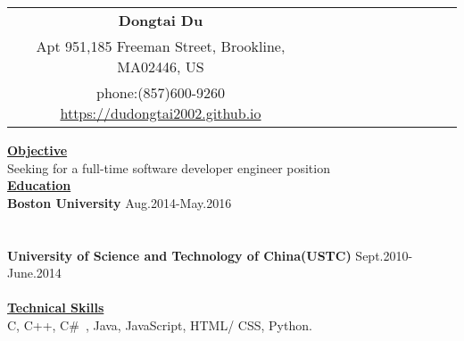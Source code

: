 \documentclass{resume} %
\begin{document}
 \small
\begin{spacing}{1}
\vspace{-0.5in}

\begin{center}
\begin{tabular}{*{11}{c}}
    \vspace{-0.5pt}
    \textbf{\Huge{Dongtai Du}}\\
    {\footnotesize Apt 951,185 Freeman Street, Brookline, MA02446, US} \\
    {\footnotesize phone:(857)600-9260} \hspace{1cm} {\footnotesize \url{https://dudongtai2002.github.io}}\hspace{1cm}{\footnotesize \url{Email:dudongtai2002@gmail.com}} \\
\end{tabular}

\uline{{\bf{\LARGE Objective}}\hfill{\hspace{15cm}{}}} \\
\vspace{1mm}
\hspace{-10.5cm} {Seeking for a full-time software developer engineer position}
\vspace{4mm}\\
\uline{{\bf{\LARGE Education}}\hfill{\hspace{15cm}{}}} \\
\vspace{1mm}
{\bf Boston University \hspace{3cm} } \hfill {\hspace{2cm}Aug.2014-May.2016} \\
\hspace{3cm}
\\
\hspace{3.0cm}{Advanced Data Structure, Cloud Computing, Machine Learning}\\
{\bf University of Science and Technology of China(USTC) \hspace{1.8cm} } \hfill {Sept.2010-June.2014} \\
\hspace{-17.2cm}{B.S. in Physics} \hspace{1.66cm}\\

\vspace{3mm}
\uline{{\bf{\LARGE Technical Skills}}\hfill{\hspace{10cm}{}}} \\
\vspace{1mm}
\hspace{-6.0cm}{\bf Languages:} \hspace{2cm} {C, C++,  C\#\ , Java, JavaScript, HTML/ CSS, Python.} \\



\end{center}
\end{spacing}
\end{document}
